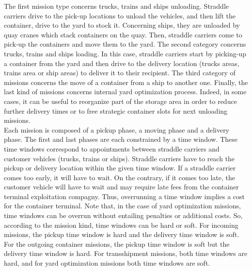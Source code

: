 \documentclass[a4paper,10pt]{article}
\begin{document}
The first mission type concerns trucks, trains and ships unloading. Straddle carriers drive to the pick-up locations to unload the vehicles, and then lift the container, drive to the yard to stock it. Concerning ships, they are unloaded by quay cranes which stack containers on the quay. Then, straddle carriers come to pick-up the containers and move them to the yard.
The second category concerns trucks, trains and ships loading. In this case, straddle carriers start by picking-up a container from the yard and then drive to the delivery location (trucks areas, trains area or ship areas) to deliver it to their recipient. 
The third category of missions concerns the move of a container from a ship to another one.
Finally, the last kind of missions concerns internal yard optimization process. Indeed, in some cases, it can be useful to reorganize part of the storage area in order to reduce further delivery times or to free strategic container slots for next unloading missions.\\

Each mission is composed of a pickup phase, a moving phase and a delivery phase. The first and last phases are each constrained by a time window. These time windows correspond to appointments between straddle carriers and customer vehicles (trucks, trains or ships). Straddle carriers have to reach the pickup or delivery location within the given time window. If a straddle carrier comes too early, it will have to wait. On the contrary, if it comes too late, the customer vehicle will have to wait and may require late fees from the container terminal exploitation compagny. Thus, overrunning a time window implies a cost for the container terminal. Note that, in the case of yard optimization missions, time windows can be overrun without entailing penalties or additional costs. So, according to the mission kind, time windows can be hard or soft. For incoming missions, the pickup time window is hard and the delivery time window is soft. For the outgoing container missions, the pickup time window is soft but the delivery time window is hard. For transshipment missions, both time windows are hard, and for yard optimization missions both time windows are soft. 
\end{document}
